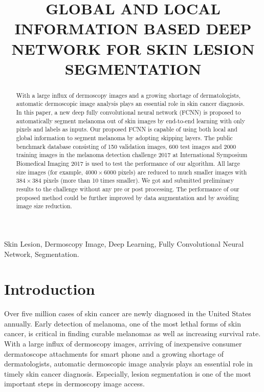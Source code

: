 \documentclass{article}
\title{GLOBAL AND LOCAL INFORMATION BASED DEEP NETWORK FOR SKIN LESION SEGMENTATION}
\begin{document}
\maketitle
\begin{abstract}
With a large influx of dermoscopy images and a growing shortage of dermatologists, automatic dermoscopic image analysis plays an essential role in skin cancer diagnosis. In this paper, a new deep fully convolutional neural network (FCNN) is proposed to automatically segment melanoma out of skin images by end-to-end learning with only pixels and labels as inputs. Our proposed FCNN is capable of using both local and global information to segment melanoma by adopting skipping layers. The public benchmark database consisting of 150 validation images, 600 test images and 2000 training images in the melanoma detection challenge 2017 at International Symposium Biomedical Imaging 2017 is used to test the performance of our algorithm. All large size images (for example, $4000\times 6000$ pixels)  are reduced to much smaller images with $384\times 384$ pixels (more than 10 times smaller).  We got and submitted preliminary results to the challenge without any pre or post processing.  The performance of our proposed method could be further improved by data augmentation and by avoiding image size reduction.

\end{abstract}
\begin{keywords}
Skin Lesion, Dermoscopy Image, Deep Learning, Fully Convolutional Neural Network, Segmentation.
\end{keywords}
\section{Introduction}
\label{sec:intro}

Over five million cases of skin cancer are newly diagnosed in the United States annually\cite{Siegel16-Nature}. Early detection of melanoma, one of the most lethal forms of skin cancer, is critical in finding curable melanomas as well as increasing survival rate\cite{Freedberg1999738,Charles2001}. With a large influx of dermoscopy images, arriving of inexpensive consumer dermatoscope attachments for smart phone\cite{MoleScope} and a growing shortage of dermatologists\cite{Kimball2008741}, automatic dermoscopic image analysis plays an essential role in timely skin cancer diagnosis. Especially, lesion segmentation is one of the most important steps in dermoscopy image access.   
\end{document}
